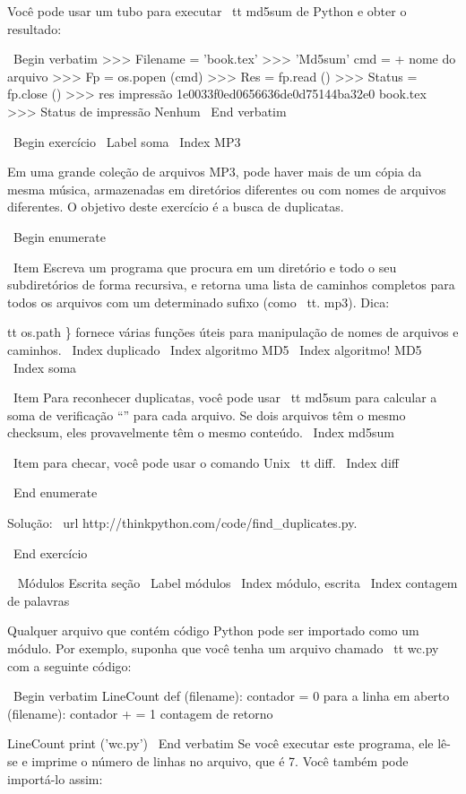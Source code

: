 \documentclass[10pt]{book}
\begin{document}
\begin {itemize}
{{{{{{{{{{Você pode usar um tubo para executar {\ tt md5sum} de Python e obter o resultado:

\ Begin {verbatim}
>>> Filename = 'book.tex'
>>> 'Md5sum' cmd = + nome do arquivo
>>> Fp = os.popen (cmd)
>>> Res = fp.read ()
>>> Status = fp.close ()
>>> res impressão
1e0033f0ed0656636de0d75144ba32e0 book.tex
>>> Status de impressão
Nenhum
\ End {verbatim}


\ Begin {} exercício
\ Label {soma}
\ Index {MP3}

Em uma grande coleção de arquivos MP3, pode haver mais de um
cópia da mesma música, armazenadas em diretórios diferentes ou com
nomes de arquivos diferentes. O objetivo deste exercício é a busca de
duplicatas.

\ Begin {enumerate}

\ Item Escreva um programa que procura em um diretório e todo o seu
subdiretórios de forma recursiva, e retorna uma lista de caminhos completos
para todos os arquivos com um determinado sufixo (como {\ tt. mp3}).
Dica: {tt os.path \} fornece várias funções úteis para
manipulação de nomes de arquivos e caminhos.
\ Index {} duplicado
\ Index {algoritmo MD5}
\ Index {algoritmo! MD5}
\ Index {soma}

\ Item Para reconhecer duplicatas, você pode usar {\ tt md5sum}
para calcular a soma de verificação ``'' para cada arquivo. Se dois arquivos têm
o mesmo checksum, eles provavelmente têm o mesmo conteúdo.
\ Index {} md5sum

\ Item para checar, você pode usar o comando Unix {\ tt diff}.
\ Index {diff}

\ End {enumerate}

Solução: \ url {http://thinkpython.com/code/find_duplicates.py}.

\ End {} exercício


\ {} Módulos Escrita seção
\ Label {módulos}
\ Index {módulo, escrita}
\ Index {contagem de palavras}

Qualquer arquivo que contém código Python pode ser importado como um módulo.
Por exemplo, suponha que você tenha um arquivo chamado {\ tt wc.py} com a seguinte
código:

\ Begin {verbatim}
LineCount def (filename):
    contador = 0
    para a linha em aberto (filename):
        contador + = 1
    contagem de retorno

LineCount print ('wc.py')
\ End {verbatim}
%
Se você executar este programa, ele lê-se e imprime o número
de linhas no arquivo, que é 7.
Você também pode importá-lo assim:

}}}}}}}}}}}
\end{itemize}
\end{document}
